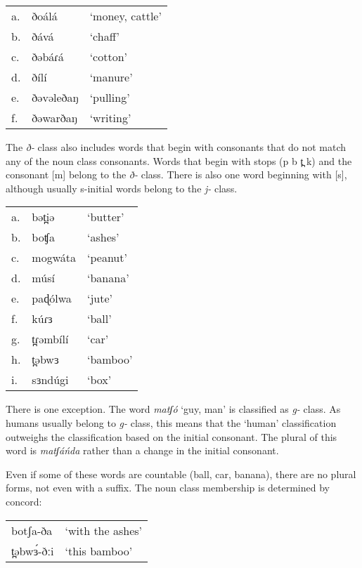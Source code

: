 \ea
\begin{tabular}[t]{lll}
a.	&	ðoálá	&	‘money, cattle’\\
b.	&	ðává	&	‘chaff’\\
c.	&	ðəbáɾá	&	‘cotton’\\
d.	&	ðílí	&	‘manure’\\
e.	&	ðəvəleðaŋ&		‘pulling’\\
f.	&	ðəwarðaŋ	&	‘writing’\\
\end{tabular}
\z

The \textit{ð-} class also includes words that begin with consonants that do not match any of the noun class consonants. Words that begin with stops (p b t̪ k) and the consonant [m] belong to the \textit{ð-} class. There is also one word beginning with [s], although usually s-initial words belong to the \textit{j-} class. 

\ea	
\begin{tabular}[t]{lll}
a.	&	bət̪iə		&	‘butter’\\
b.	&	boʧa		&	‘ashes’\\
c.	&	mogwáta		&	‘peanut’\\
d.	&	músí		&	‘banana’\\
e.	&	paɖólwa		&	‘jute’\\
f.	&	kúɾɜ		&	‘ball’\\
g.	&	t̪ɾəmbílí	&	‘car’\\
h.	&	t̪əbwɜ		&	‘bamboo’\\
i.	&	sɜndúgi		&	‘box’\\	
\end{tabular}

\z

There is one exception. The word \textit{matʃó} ‘guy, man’ is classified as \textit{g-} class. As humans usually belong to \textit{g-} class, this means that the ‘human’ classification outweighs the classification based on the initial consonant. The plural of this word is \textit{matʃáńda} rather than a change in the initial consonant. 

Even if some of these words are countable (ball, car, banana), there are no plural forms, not even with a suffix. The noun class membership is determined by concord:

\ea
\begin{tabular}[t]{ll}
	botʃa-ða	&	‘with the ashes’\\
	t̪əbwɜ́-ðːi	&	‘this bamboo’\\
\end{tabular}
\z


